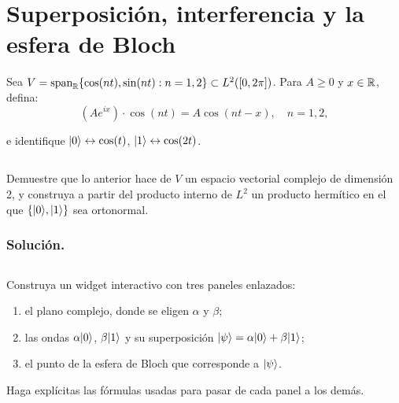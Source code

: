\documentclass[12pt]{article}
\begin{document}



\newpage

\renewcommand{\contentsname}{Tabla de contenido}
\tableofcontents
\newpage


\color{rojoUN}

\section{Superposición, interferencia y la esfera de Bloch}

Sea $V = \text{span}_{\mathbb{R}}\{\cos(nt), \sin(nt) : n = 1,2\} \subset L^2([0, 2\pi])$. Para $A \ge 0$ y $x \in \mathbb{R}$, defina:
\begin{equation}
 (A e^{i x}) \cdot \cos(nt) = A \cos(nt - x), \quad n=1,2, 
 \label{eq:fase}
\end{equation}

e identifique $\lvert 0\rangle \leftrightarrow \cos(t)$, $\lvert 1\rangle \leftrightarrow \cos(2t)$.

\subsection{}

Demuestre que lo anterior hace de $V$ un espacio vectorial complejo de dimensión 2, y construya a partir del producto interno de $L^2$ un producto hermítico en el que $\{\lvert 0\rangle, \lvert 1\rangle\}$ sea ortonormal.

\color{Black}

\subsubsection*{Solución.}




\color{rojoUN}

\subsection{}

Construya un widget interactivo con tres paneles enlazados:
    \begin{enumerate}[label=(\alph*)]
        \item el plano complejo, donde se eligen $\alpha$ y $\beta$;
        \item las ondas $\alpha\lvert 0\rangle$, $\beta\lvert 1\rangle$ y su superposición $\lvert \psi\rangle = \alpha\lvert 0\rangle + \beta\lvert 1\rangle$;
        \item el punto de la esfera de Bloch que corresponde a $\lvert \psi\rangle$.
    \end{enumerate}
    Haga explícitas las fórmulas usadas para pasar de cada panel a los demás.
\end{document}
